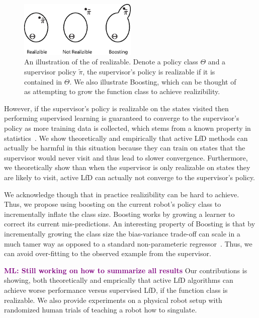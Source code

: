 \documentclass[10pt, conference]{ieeeconf}      %
\newcommand{\mlnote}[1]{\ifthenelse{ \boolean{include-notes}}%
 {\textcolor{purple}{\textbf{ML: #1}}}{}}
\begin{document}
\begin{figure}
\includegraphics[width=0.5\textwidth]{f_figs/realizibility.eps}
\caption{
    \footnotesize
An illustration of the  of realizable. Denote a policy class $\Theta$ and a supervisor policy $\tilde{\pi}$, the supervisor's policy is realizable if it is contained in $\Theta$. We also illustrate Boosting, which can be thought of as attempting to grow the function class to achieve realizibility.}
\vspace*{-20pt}
\label{fig:teaserl}
\end{figure}

However, if the supervisor's policy is realizable on the states visited then performing  supervised learning is guaranteed to converge to the supervisor's policy as more training data is collected, which stems from a known property in statistics~\cite{anthony2009neural}. We show theoretically and empirically that active LfD methods can actually be harmful in this situation because they can train on states that the supervisor would never visit and thus lead to slower convergence. Furthermore, we theoretically show than when the supervisor is only realizable on states they are likely to visit, active LfD can actually not converge to the supervisor's policy.

We acknowledge though that in practice realizibility can be hard to achieve. Thus, we propose using boosting on the current robot's policy class to incrementally inflate the class size. Boosting works by growing a learner to correct its current mis-predictions. An interesting property of Boosting is that by incrementally growing the class size the bias-variance trade-off can scale in a much tamer way as opposed to a standard non-parameteric regressor~\cite{buhlmann2003boosting}. Thus, we can avoid over-fitting to the observed example from the supervisor. 

\mlnote{Still working on how to summarize all results}
Our contributions is showing, both theoretically and emprically that active LfD algorithms can achieve worse performance versus supervised LfD, if the function class is realizable. We also provide experiments on a physical robot setup with randomized human trials of teaching a robot how to singulate. 
\end{document}
